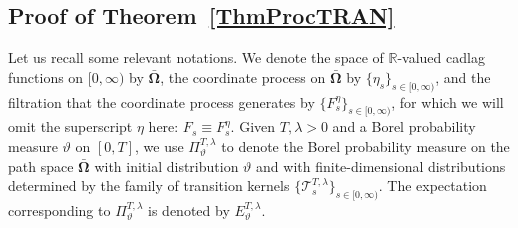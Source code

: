 \documentclass[10pt]{article}
\numberwithin{equation}{section}
\theoremstyle{definition}
\newcommand{\R}{{\mathbb R}}
\begin{document}
\subsection{Proof of Theorem~\ref{ThmProcTRAN}}\label{SubsectionThmProcTRAN}


Let us recall some relevant notations.  We denote the space of $\R$-valued cadlag functions on $[0,\infty)$  by $ \boldsymbol{\bar{\Omega}}$, the coordinate process on $  \boldsymbol{\bar{\Omega}}$ by  $\{\eta_s\}_{s\in [0,\infty) }$, and the filtration that the coordinate process generates by $\{F_s^{\eta}\}_{s\in [0,\infty)}$, for which we will omit the superscript $\eta$ here: $F_s\equiv F_s^{\eta}$. Given $T,\lambda>0$ and a Borel probability measure $\vartheta$ on $[0,T]$, we use $\Pi^{T,\lambda}_{\vartheta}$ to denote the Borel probability measure on the path space $ \boldsymbol{\bar{\Omega}}$ with initial distribution $\vartheta$ and with finite-dimensional distributions determined by the family of transition kernels $\{ \mathscr{T}^{T,\lambda}_s\}_{s\in [0,\infty)}  $.  The expectation corresponding to $\Pi^{T,\lambda}_{\vartheta}$ is denoted by  $E^{T,\lambda }_{\vartheta}$.  

    
\end{document}
